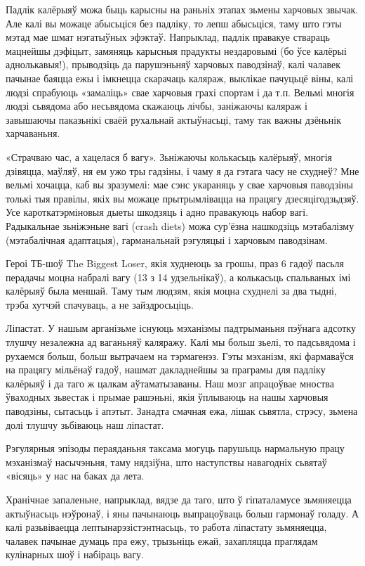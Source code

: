 Падлік калёрыяў можа быць карысны на раньніх этапах зьмены харчовых звычак. Але калі вы можаце абысьціся без падліку, то лепш абысьціся, таму што гэты мэтад мае шмат нэгатыўных эфэктаў. Напрыклад, падлік правакуе ствараць мацнейшы дэфіцыт, замяняць карысныя прадукты нездаровымі (бо ўсе калёрыі аднолькавыя!), прыводзіць да парушэньняў харчовых паводзінаў, калі чалавек пачынае баяцца ежы і імкнецца скарачаць каляраж, выклікае пачуцьцё віны, калі людзі спрабуюць «замаліць» свае харчовыя грахі спортам і да т.п. Вельмі многія людзі сьвядома або несьвядома скажаюць лічбы, заніжаючы каляраж і завышаючы паказьнікі сваёй рухальнай актыўнасьці, таму так важны дзёньнік харчаваньня.

«Страчваю час, а хацелася б вагу». Зьніжаючы колькасьць калёрыяў, многія дзівяцца, маўляў, ня ем ужо тры гадзіны, і чаму я да гэтага часу не схуднеў? Мне вельмі хочацца, каб вы зразумелі: мае сэнс укараняць у свае харчовыя паводзіны толькі тыя правілы, якіх вы можаце прытрымлівацца на працягу дзесяцігодзьдзяў. Усе кароткатэрміновыя дыеты шкодзяць і адно правакуюць набор вагі. Радыкальнае зьніжэньне вагі (crash diets) можа сур'ёзна нашкодзіць мэтабалізму (мэтабалічная адаптацыя), гарманальнай рэгуляцыі і харчовым паводзінам.

Героі ТБ-шоў The Biggest Loser, якія худнеюць за грошы, праз 6 гадоў пасьля перадачы моцна набралі вагу (13 з 14 удзельнікаў), а колькасьць спальваных імі калёрыяў была меншай. Таму тым людзям, якія моцна схуднелі за два тыдні, трэба хутчэй спачуваць, а не зайздросьціць.

Ліпастат. У нашым арганізьме існуюць мэханізмы падтрыманьня пэўнага адсотку тлушчу незалежна ад ваганьняў каляражу. Калі мы больш зьелі, то падсьвядома і рухаемся больш, больш вытрачаем на тэрмагенэз. Гэты мэханізм, які фармаваўся на працягу мільёнаў гадоў, нашмат дакладнейшы за праграмы для падліку калёрыяў і да таго ж цалкам аўтаматызаваны. Наш мозг апрацоўвае мноства ўваходных зьвестак і прымае рашэньні, якія ўплываюць на нашы харчовыя паводзіны, сытасьць і апэтыт. Занадта смачная ежа, лішак сьвятла, стрэсу, зьмена долі тлушчу зьбіваюць наш ліпастат.

Рэгулярныя эпізоды пераяданьня таксама могуць парушыць нармальную працу мэханізмаў насычэньня, таму нядзіўна, што наступствы навагодніх сьвятаў «вісяць» у нас на баках да лета.

Хранічнае запаленьне, напрыклад, вядзе да таго, што ў гіпаталамусе зьмяняецца актыўнасьць нэўронаў, і яны пачынаюць выпрацоўваць больш гармонаў голаду. А калі разьвіваецца лептынарэзістэнтнасьць, то работа ліпастату зьмяняецца, чалавек пачынае думаць пра ежу, трызьніць ежай, захапляцца праглядам кулінарных шоў і набіраць вагу.

